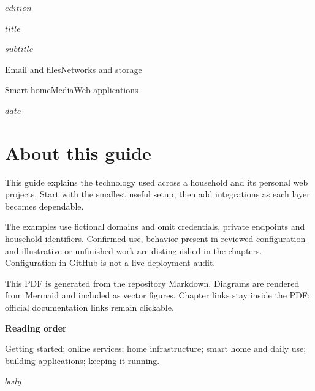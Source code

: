\documentclass[11pt,a4paper,oneside,openany]{report}
\begin{document}
\begin{titlepage}
\thispagestyle{empty}
\vspace*{20mm}
{\sffamily\large\color{GuideMuted}$edition$\par}
\vspace{14mm}
{\sffamily\fontsize{38}{43}\selectfont\bfseries\color{GuideInk}$title$\par}
\vspace{9mm}
{\sffamily\Large\color{GuideMuted}$subtitle$\par}
\vfill
{\sffamily\large Email and files\quad Networks and storage\par}
\vspace{2mm}
{\sffamily\large Smart home\quad Media\quad Web applications\par}
\vspace{14mm}
{\sffamily\color{GuideMuted}$date$\par}
\end{titlepage}
\chapter*{About this guide}
This guide explains the technology used across a household and its personal web projects. Start with the smallest useful setup, then add integrations as each layer becomes dependable.

The examples use fictional domains and omit credentials, private endpoints and household identifiers. Confirmed use, behavior present in reviewed configuration and illustrative or unfinished work are distinguished in the chapters. Configuration in GitHub is not a live deployment audit.

This PDF is generated from the repository Markdown. Diagrams are rendered from Mermaid and included as vector figures. Chapter links stay inside the PDF; official documentation links remain clickable.

\vspace{5mm}
{\sffamily\bfseries Reading order}\par
Getting started; online services; home infrastructure; smart home and daily use; building applications; keeping it running.
\clearpage
\hypertarget{guide-contents}{}
\tableofcontents
\clearpage
\listoffigures
\clearpage
{}
$body$
\end{document}
